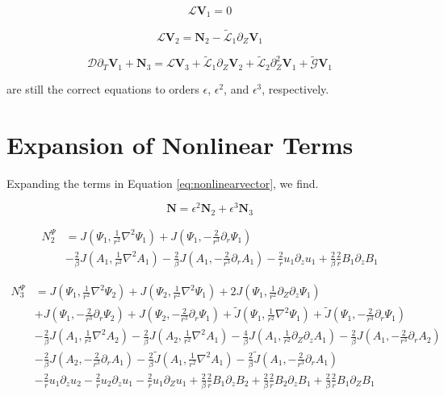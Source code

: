 \documentclass{paper}
\newcommand{\beq}{\begin{equation}}
\newcommand{\eeq}{\end{equation}}
\begin{document}
\beq
\mathcal{L} \mathbf{V}_1 = 0
\eeq

\beq
\mathcal{L} \mathbf{V}_2 = \mathbf{N}_2 - \mathcal{\widetilde{L}}_1 \partial_Z \mathbf{V}_1
\eeq

\beq
\mathcal{D}\partial_T\mathbf{V}_1 + \mathbf{N}_3 = \mathcal{L}\mathbf{V}_3 + \mathcal{\widetilde{L}}_1 \partial_Z \mathbf{V}_2 + \mathcal{\widetilde{L}}_2\partial_Z^2 \mathbf{V}_1 + \mathcal{\widetilde{G}}\mathbf{V}_1
\eeq

are still the correct equations to orders $\epsilon$, $\epsilon^2$, and $\epsilon^3$, respectively.


\section{Expansion of Nonlinear Terms}

Expanding the terms in Equation \ref{eq:nonlinearvector}, we find.

\beq
\mathbf{N} = \epsilon^2 \mathbf{N}_2 + \epsilon^3 \mathbf{N}_3
\eeq

\beq
\begin{split}
N_2^{\Psi} & = J\left(\Psi_1, \frac{1}{r^2} \nabla^2 \Psi_1\right) + J\left(\Psi_1, -\frac{2}{r^3}\partial_r\Psi_1\right) \\
&- \frac{2}{\beta} J \left(A_1, \frac{1}{r^2} \nabla^2 A_1\right) - \frac{2}{\beta} J\left(A_1, -\frac{2}{r^3} \partial_r A_1\right) - \frac{2}{r} u_1 \partial_z u_1 + \frac{2}{\beta} \frac{2}{r} B_1 \partial_z B_1
\end{split}
\eeq

\beq
\begin{split}
N_3^{\Psi} & = J\left(\Psi_1, \frac{1}{r^2} \nabla^2 \Psi_2\right) + J\left(\Psi_2, \frac{1}{r^2} \nabla^2\Psi_1\right) + 2 J \left(\Psi_1, \frac{1}{r^2}\partial_Z\partial_z \Psi_1\right) \\
&+ J\left(\Psi_1, -\frac{2}{r^3}\partial_r \Psi_2\right) + J\left(\Psi_2, -\frac{2}{r^3}\partial_r \Psi_1\right) + \widetilde{J}\left(\Psi_1, \frac{1}{r^2} \nabla^2 \Psi_1\right) + \widetilde{J} \left(\Psi_1, -\frac{2}{r^3}\partial_r \Psi_1\right)\\
& - \frac{2}{\beta} J\left(A_1, \frac{1}{r^2}\nabla^2 A_2\right) - \frac{2}{\beta} J\left(A_2, \frac{1}{r^2}\nabla^2 A_1\right) - \frac{4}{\beta} J\left(A_1, \frac{1}{r^2}\partial_Z\partial_z A_1\right) - \frac{2}{\beta} J\left(A_1, -\frac{2}{r^3} \partial_r A_2 \right) \\
& - \frac{2}{\beta} J\left(A_2, -\frac{2}{r^3} \partial_r A_1\right) - \frac{2}{\beta} \widetilde{J} \left(A_1, \frac{1}{r^2} \nabla^2 A_1\right) - \frac{2}{\beta} \widetilde{J} \left(A_1, -\frac{2}{r^3} \partial_r A_1\right) \\
& - \frac{2}{r} u_1 \partial_z u_2 - \frac{2}{r} u_2 \partial_z u_1 - \frac{2}{r} u_1 \partial_Z u_1 + \frac{2}{\beta}\frac{2}{r} B_1\partial_z B_2 + \frac{2}{\beta}\frac{2}{r} B_2 \partial_z B_1 + \frac{2}{\beta} \frac{2}{r} B_1 \partial_Z B_1
\end{split}
\eeq
\end{document}
